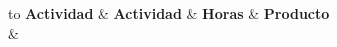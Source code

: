 \begin{longtabu} to \textwidth{
		X[3,c] X[1,c] X[3,c]}
	\toprule
	\textbf{Actividad} & \textbf{Actividad} & \textbf{Horas} & \textbf{Producto} \\
	\hline
	\endfirsthead
	\hline
	 &  \\
	\hline
	\endhead
	\hline
	\endfoot
	\hline
	 \\
	\hline
	\caption{Calendario de actividades}
	\label{table:calendar}
	\endlastfoot
	
	
\end{longtabu}

